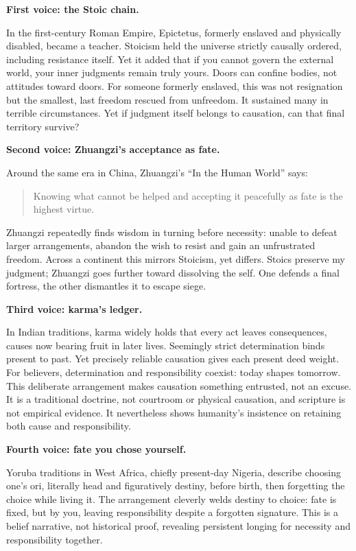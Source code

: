 \textbf{First voice: the Stoic chain.}

In the first-century Roman Empire, Epictetus, formerly enslaved and physically disabled, became a teacher. Stoicism held the universe strictly causally ordered, including resistance itself. Yet it added that if you cannot govern the external world, your inner judgments remain truly yours. Doors can confine bodies, not attitudes toward doors. For someone formerly enslaved, this was not resignation but the smallest, last freedom rescued from unfreedom. It sustained many in terrible circumstances. Yet if judgment itself belongs to causation, can that final territory survive?

\textbf{Second voice: Zhuangzi's acceptance as fate.}

Around the same era in China, Zhuangzi's ``In the Human World'' says:

\begin{quote}
Knowing what cannot be helped and accepting it peacefully as fate is the highest virtue.
\end{quote}
Zhuangzi repeatedly finds wisdom in turning before necessity: unable to defeat larger arrangements, abandon the wish to resist and gain an unfrustrated freedom. Across a continent this mirrors Stoicism, yet differs. Stoics preserve my judgment; Zhuangzi goes further toward dissolving the self. One defends a final fortress, the other dismantles it to escape siege.

\textbf{Third voice: karma's ledger.}

In Indian traditions, karma widely holds that every act leaves consequences, causes now bearing fruit in later lives. Seemingly strict determination binds present to past. Yet precisely reliable causation gives each present deed weight. For believers, determination and responsibility coexist: today shapes tomorrow. This deliberate arrangement makes causation something entrusted, not an excuse. It is a traditional doctrine, not courtroom or physical causation, and scripture is not empirical evidence. It nevertheless shows humanity's insistence on retaining both cause and responsibility.

\textbf{Fourth voice: fate you chose yourself.}

Yoruba traditions in West Africa, chiefly present-day Nigeria, describe choosing one's ori, literally head and figuratively destiny, before birth, then forgetting the choice while living it. The arrangement cleverly welds destiny to choice: fate is fixed, but by you, leaving responsibility despite a forgotten signature. This is a belief narrative, not historical proof, revealing persistent longing for necessity and responsibility together.


